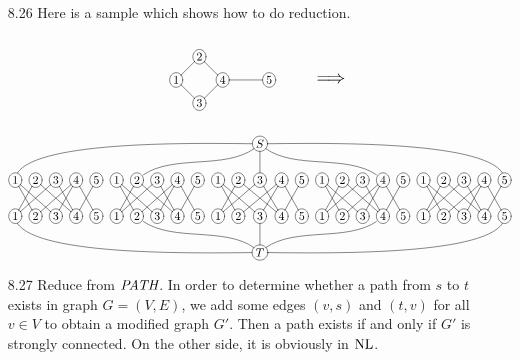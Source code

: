 \begin{itemize}
	\item[8.26]
	Here is a sample which shows how to do reduction.
	\begin{gather*}
		\xymatrix@ur@R=1pc@C=1pc{
			*+[o][F-]{1} \ar@{-}[d] \ar@{-}[r] & *+[o][F-]{2} & \\
			*+[o][F-]{3} & *+[o][F-]{4} \ar@{-}[u] \ar@{-}[l] \ar@{-}[rd] & \\
			& & *+[o][F-]{5}
		}
		\scalebox{1.5}{$\qquad \implies$} \\
		\xymatrix@R=1.5pc@C=0.5pc{
			&&&&&&&&&&&& 
			*+[o][F-]{S} 
			\ar@{-}@(l,u)[dllllllllllll]
			\ar@{-}@(ld,ur)[dllllll]
			\ar@{-}[d]
			\ar@{-}@(rd,ul)[drrrrrr]
			\ar@{-}@(r,u)[drrrrrrrrrrrr]
			&&&&&&&&&&&& \\
			*+[o][F-]{1} \ar@{-}[rd] \ar@{-}[rrd] & *+[o][F-]{2} \ar@{-}[dl] \ar@{-}[drr] & *+[o][F-]{3} \ar@{-}[dll] \ar@{-}[dr] & *+[o][F-]{4} \ar@{-}[dl] \ar@{-}[dll] \ar@{-}[dr] & *+[o][F-]{5} \ar@{-}[dl] &
			*+[o][F-]{1} \ar@{-}[rd] \ar@{-}[rrd] & *+[o][F-]{2} \ar@{-}[dl] \ar@{-}[drr] & *+[o][F-]{3} \ar@{-}[dll] \ar@{-}[dr] & *+[o][F-]{4} \ar@{-}[dl] \ar@{-}[dll] \ar@{-}[dr] & *+[o][F-]{5} \ar@{-}[dl] &
			*+[o][F-]{1} \ar@{-}[rd] \ar@{-}[rrd] & *+[o][F-]{2} \ar@{-}[dl] \ar@{-}[drr] & *+[o][F-]{3} \ar@{-}[dll] \ar@{-}[dr] & *+[o][F-]{4} \ar@{-}[dl] \ar@{-}[dll] \ar@{-}[dr] & *+[o][F-]{5} \ar@{-}[dl] &
			*+[o][F-]{1} \ar@{-}[rd] \ar@{-}[rrd] & *+[o][F-]{2} \ar@{-}[dl] \ar@{-}[drr] & *+[o][F-]{3} \ar@{-}[dll] \ar@{-}[dr] & *+[o][F-]{4} \ar@{-}[dl] \ar@{-}[dll] \ar@{-}[dr] & *+[o][F-]{5} \ar@{-}[dl] &
			*+[o][F-]{1} \ar@{-}[rd] \ar@{-}[rrd] & *+[o][F-]{2} \ar@{-}[dl] \ar@{-}[drr] & *+[o][F-]{3} \ar@{-}[dll] \ar@{-}[dr] & *+[o][F-]{4} \ar@{-}[dl] \ar@{-}[dll] \ar@{-}[dr] & *+[o][F-]{5} \ar@{-}[dl] \\
			*+[o][F-]{1} & *+[o][F-]{2} & *+[o][F-]{3} & *+[o][F-]{4} & *+[o][F-]{5} &
			*+[o][F-]{1} & *+[o][F-]{2} & *+[o][F-]{3} & *+[o][F-]{4} & *+[o][F-]{5} &
			*+[o][F-]{1} & *+[o][F-]{2} & *+[o][F-]{3} & *+[o][F-]{4} & *+[o][F-]{5} &
			*+[o][F-]{1} & *+[o][F-]{2} & *+[o][F-]{3} & *+[o][F-]{4} & *+[o][F-]{5} &
			*+[o][F-]{1} & *+[o][F-]{2} & *+[o][F-]{3} & *+[o][F-]{4} & *+[o][F-]{5} \\
			&&&&&&&&&&&& 
			*+[o][F-]{T} 
			\ar@{-}@(l,d)[ullllllllllll]
			\ar@{-}@(lu,dr)[ullllll]
			\ar@{-}[u]
			\ar@{-}@(ru,dl)[urrrrrr]
			\ar@{-}@(r,d)[urrrrrrrrrrrr]
			&&&&&&&&&&&&
		}
	\end{gather*}
	
	\item[8.27]
	Reduce from $\textit{PATH}$. In order to determine whether a path from $s$ to $t$ exists in graph $G = (V, E)$, we add some edges $(v, s)$ and $(t, v)$ for all $v \in V$ to obtain a modified graph $G'$. Then a path exists if and only if $G'$ is strongly connected. On the other side, it is obviously in $\textrm{NL}$.
	
\end{itemize}